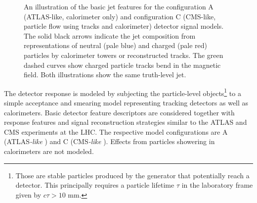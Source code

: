 \documentclass[11pt]{cernrep}
\begin{document}
\begin{figure}
\begin{center}
\end{center}
\caption{An illustration of the basic jet features for the configuration A (ATLAS-like, calorimeter only) and configuration C (CMS-like, particle flow using tracks and calorimeter) detector signal models. The solid black arrows indicate the jet composition from representations of neutral (pale blue) and charged (pale red) particles by calorimeter towers or reconstructed tracks. The green dashed curves show charged particle tracks bend in the magnetic field. Both illustrations show the same truth-level jet.}
\label{jetsub_2prong_fig:detmodel}
\end{figure}


The detector response is modeled by subjecting the particle-level objects\footnote{Those are stable particles produced by the generator that potentially reach a detector.  This principally requires a particle lifetime $\tau$ in the laboratory frame given by $c\tau > 10$ mm.}
to a simple acceptance and smearing model representing tracking detectors as well as calorimeters.
%
Basic detector feature descriptors are considered together with response features and signal reconstruction strategies similar to the ATLAS and CMS experiments at the LHC.
%
The respective model configurations are A (ATLAS{\emph{-like}} \cite{PERF-2007-01}) and C (CMS\emph{-like} \cite{CMS-TDR-08-001}).
%
Effects from particles showering in calorimeters are not modeled. 
\end{document}

